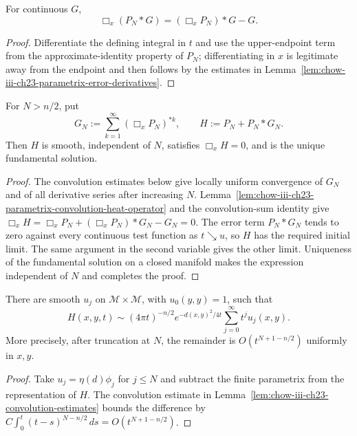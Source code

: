 \begin{lemma}
\label{lem:chow-iii-ch23-parametrix-convolution-heat-operator}
For continuous $G$,
\[
\Box_x(P_N*G)=(\Box_xP_N)*G-G.
\]
\end{lemma}
\begin{proof}
Differentiate the defining integral in $t$ and use the upper-endpoint term
from the approximate-identity property of $P_N$; differentiating in $x$ is
legitimate away from the endpoint and then follows by the estimates in
Lemma~\ref{lem:chow-iii-ch23-parametrix-error-derivatives}.
\end{proof}

\begin{theorem}
\label{thm:chow-iii-ch23-parametrix-heat-kernel}
For $N>n/2$, put
\[
G_N:=\sum_{k=1}^{\infty}(\Box_xP_N)^{*k},\qquad H:=P_N+P_N*G_N.
\]
Then $H$ is smooth, independent of $N$, satisfies $\Box_xH=0$, and is the
unique fundamental solution.
\end{theorem}
\begin{proof}
The convolution estimates below give locally uniform convergence of $G_N$ and
of all derivative series after increasing $N$.  Lemma~\ref{lem:chow-iii-ch23-parametrix-convolution-heat-operator} and the convolution-sum identity give
\(\Box_xH=\Box_xP_N+(\Box_xP_N)*G_N-G_N=0\).  The error term
\(P_N*G_N\) tends to zero against every continuous test function as $t\searrow u$,
so $H$ has the required initial limit.  The same argument in the second
variable gives the other limit.  Uniqueness of the fundamental solution on a
closed manifold makes the expression independent of $N$ and completes the
proof.
\end{proof}

\begin{theorem}
\label{thm:chow-iii-ch23-heat-kernel-expansion}
There are smooth $u_j$ on $\mathcal M\times\mathcal M$, with $u_0(y,y)=1$, such that
\[
H(x,y,t)\sim(4\pi t)^{-n/2}e^{-d(x,y)^2/4t}\sum_{j=0}^{\infty}t^ju_j(x,y).
\]
More precisely, after truncation at $N$, the remainder is
\(O(t^{N+1-n/2})\) uniformly in $x,y$.
\end{theorem}
\begin{proof}
Take $u_j=\eta(d)\phi_j$ for $j\le N$ and subtract the finite parametrix
from the representation of $H$.  The convolution estimate in
Lemma~\ref{lem:chow-iii-ch23-convolution-estimates} bounds the difference by
\(C\int_0^t(t-s)^{N-n/2}\,ds=O(t^{N+1-n/2})\).
\end{proof}

